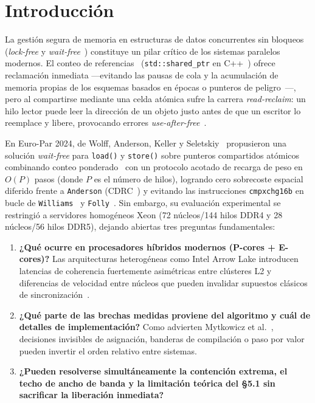 \documentclass[10pt,twocolumn,a4paper]{article}
\begin{document}
\section{Introducción}

La gestión segura de memoria en estructuras de datos concurrentes sin bloqueos (\emph{lock-free} y \emph{wait-free}~\cite{herlihy1991waitfree}) constituye un pilar crítico de los sistemas paralelos modernos. El conteo de referencias~\cite{collins1960refcount} (\texttt{std::shared\_ptr} en C++~\cite{sutter2014atomic}) ofrece reclamación inmediata —evitando las pausas de cola y la acumulación de memoria propias de los esquemas basados en épocas o punteros de peligro~\cite{michael2004hazard,kim2024epochs}—, pero al compartirse mediante una celda atómica sufre la carrera \emph{read-reclaim}: un hilo lector puede leer la dirección de un objeto justo antes de que un escritor lo reemplace y libere, provocando errores \emph{use-after-free}~\cite{chen2023uaf}.

En Euro-Par 2024, de Wolff, Anderson, Keller y Seletskiy~\cite{dewolff2024waitfree} propusieron una solución \emph{wait-free} para \texttt{load()} y \texttt{store()} sobre punteros compartidos atómicos combinando conteo ponderado~\cite{bevan1987weighted,watson1987weighted} con un protocolo acotado de recarga de peso en $O(P)$ pasos (donde $P$ es el número de hilos), logrando cero sobrecoste espacial diferido frente a \texttt{Anderson} (CDRC~\cite{anderson2021cdrc,anderson2022turning}) y evitando las instrucciones \texttt{cmpxchg16b} en bucle de \texttt{Williams}~\cite{williams2012concurrency} y \texttt{Folly}~\cite{folly2024}. Sin embargo, su evaluación experimental se restringió a servidores homogéneos Xeon (72 núcleos/144 hilos DDR4 y 28 núcleos/56 hilos DDR5), dejando abiertas tres preguntas fundamentales:
\begin{enumerate}
  \item \textbf{¿Qué ocurre en procesadores híbridos modernos (P-cores + E-cores)?} Las arquitecturas heterogéneas como Intel Arrow Lake introducen latencias de coherencia fuertemente asimétricas entre clústeres L2 y diferencias de velocidad entre núcleos que pueden invalidar supuestos clásicos de sincronización~\cite{schone2024alderlake,liu2022libasl}.
  \item \textbf{¿Qué parte de las brechas medidas proviene del algoritmo y cuál de detalles de implementación?} Como advierten Mytkowicz et al.~\cite{mytkowicz2009wrongdata}, decisiones invisibles de asignación, banderas de compilación o paso por valor pueden invertir el orden relativo entre sistemas.
  \item \textbf{¿Pueden resolverse simultáneamente la contención extrema, el techo de ancho de banda y la limitación teórica del \S 5.1 sin sacrificar la liberación inmediata?}
\end{enumerate}
\end{document}
